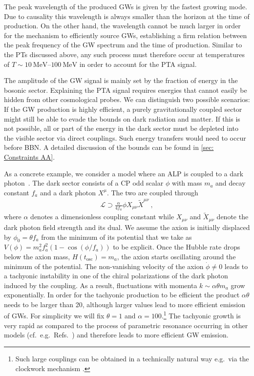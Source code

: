 \documentclass{article}
\begin{document}
The peak wavelength of the produced GWs is given by the fastest growing mode. Due to causality this wavelength is always smaller than the horizon at the time of production. On the other hand, the wavelength cannot be much larger in order for the mechanism to efficiently source GWs, establishing a firm relation between the peak frequency of the GW spectrum and the time of production. Similar to the PTs discussed above, any such process must therefore occur at temperatures of $T\sim\SIrange{10}{100}{\MeV}$ in order to account for the PTA signal.

The amplitude of the GW signal is mainly set by the fraction of energy in the bosonic sector. Explaining the PTA signal requires energies that cannot easily be hidden from other cosmological probes. We can distinguish two possible scenarios: If the GW production is highly efficient, a purely gravitationally coupled sector might still be able to evade the bounds on dark radiation and matter. If this is not possible, all or part of the energy in the dark sector must be depleted into the visible sector via direct couplings. Such energy transfers would need to occur before BBN. A detailed discussion of the bounds can be found in \cref{sec: Constraints AA}.

\bigskip 

As a concrete example, we consider a model where an ALP is coupled to a dark photon~\cite{Anber:2009ua,Barnaby:2012xt,Machado:2018nqk}. The dark sector consists of a CP odd scalar $\phi$ with mass $m_a$ and decay constant $f_a$ and a dark photon $X^{\mu}$. The two are coupled through
\begin{align}
    \mathcal{L}\supset \frac{\alpha}{4f_a} \phi X_{\mu\nu}\tilde X^{\mu\nu}~,
\end{align}
where $\alpha$ denotes a dimensionless coupling constant while $X_{\mu\nu}$ and $\tilde X_{\mu\nu}$ denote the dark photon field strength and its dual. We assume the axion is initially displaced by $\phi_0=\theta f_a$ from the minimum of its potential that we take as $V(\phi)=m_a^2 f_a^2 (1-\cos(\phi/f_a))$ to be explicit. Once the Hubble rate drops below the axion mass, $H(t_\mathrm{osc})=m_a$, the axion starts oscillating around the minimum of the potential. The non-vanishing velocity of the axion $\dot\phi\neq 0$ leads to a tachyonic instability in one of the chiral polarizations of the dark photon induced by the coupling.  As a result, fluctuations with momenta $k\sim \alpha\theta m_{a}$ grow exponentially. In order for the tachyonic production to be efficient the product $\alpha\theta$ needs to be larger than 20, although larger values lead to more efficient emission of GWs. For simplicity we will fix $\theta=1$ and $\alpha=100$.\footnote{Such large couplings can be obtained in a technically natural way e.g.\ via the clockwork mechanism \cite{Choi:2014rja,Kaplan:2015fuy}.} The tachyonic growth is very rapid as compared to the process of parametric resonance occurring in other models (cf.\ e.g.\ Refs.~\cite{Figueroa:2016wxr,Chatrchyan:2020pzh}) and therefore leads to more efficient GW emission. 
\end{document}
